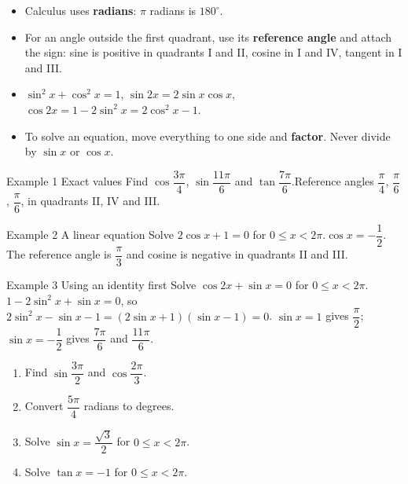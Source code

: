 \documentclass[11pt]{article}
\begin{document}

\begin{ideabox}
\begin{itemize}[leftmargin=*,itemsep=2pt,topsep=2pt]
  \item Calculus uses \textbf{radians}: $\pi$ radians is $180^\circ$.
  \item For an angle outside the first quadrant, use its \textbf{reference angle} and attach the sign: sine is positive in quadrants I and II, cosine in I and IV, tangent in I and III.
  \item $\sin^2x+\cos^2x=1$, \quad $\sin2x=2\sin x\cos x$, \quad $\cos2x=1-2\sin^2x=2\cos^2x-1$.
  \item To solve an equation, move everything to one side and \textbf{factor}. Never divide by $\sin x$ or $\cos x$.
\end{itemize}
\end{ideabox}

\begin{example}{Example 1 \textperiodcentered{} Exact values}
Find $\cos\dfrac{3\pi}{4}$, $\sin\dfrac{11\pi}{6}$ and $\tan\dfrac{7\pi}{6}$.\soln Reference angles $\dfrac\pi4$, $\dfrac\pi6$, $\dfrac\pi6$, in quadrants II, IV and III.
\end{example}

\begin{example}{Example 2 \textperiodcentered{} A linear equation}
Solve $2\cos x+1=0$ for $0\le x<2\pi$.\soln $\cos x=-\dfrac12$. The reference angle is $\dfrac\pi3$ and cosine is negative in quadrants II and III.
\end{example}

\begin{example}{Example 3 \textperiodcentered{} Using an identity first}
Solve $\cos2x+\sin x=0$ for $0\le x<2\pi$.\soln $1-2\sin^2x+\sin x=0$, so $2\sin^2x-\sin x-1=(2\sin x+1)(\sin x-1)=0$. $\sin x=1$ gives $\dfrac\pi2$; $\sin x=-\dfrac12$ gives $\dfrac{7\pi}{6}$ and $\dfrac{11\pi}{6}$.
\end{example}

\newpage
{}

\begin{enumerate}[leftmargin=*,itemsep=2pt]
  \item Find $\sin\dfrac{3\pi}{2}$ and $\cos\dfrac{2\pi}{3}$.\work{2.3cm}
  \item Convert $\dfrac{5\pi}{4}$ radians to degrees.\work{2.3cm}
  \item Solve $\sin x=\dfrac{\sqrt3}{2}$ for $0\le x<2\pi$.\work{2.3cm}
  \item Solve $\tan x=-1$ for $0\le x<2\pi$.\work{2.3cm}
\end{enumerate}
\end{document}
